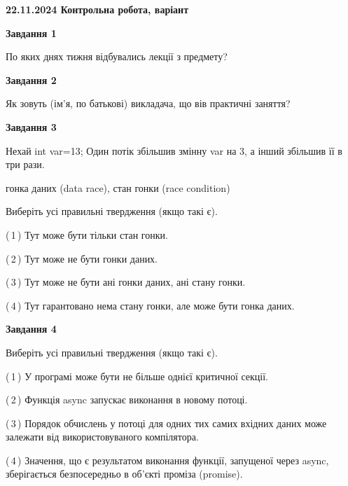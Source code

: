 \documentclass[12pt, ukrainian]{article}
\begin{document}
\begin {large}

\textbf{22.11.2024 Контрольна робота, варіант  }\par


{

\begin{center}
\textbf{Завдання 1}
\end{center}

По яких днях тижня відбувались лекції з предмету?


\begin{center}
\textbf{Завдання 2}
\end{center}

Як зовуть (ім'я, по батькові) викладача, що вів практичні заняття?


\begin{center}
\textbf{Завдання 3}
\end{center}

Нехай int var=13; Один потік збільшив змінну var на 3, а інший збільшив її в три рази.

гонка даних (data race), стан гонки (race condition)

Виберіть усі правильні твердження (якщо такі є).\par
\vspace{2mm}
(\,1\,) Тут може бути тільки стан гонки.%

(\,2\,) Тут може не бути гонки даних.%

(\,3\,) Тут може не бути ані гонки даних, ані стану гонки.%

(\,4\,) Тут гарантовано нема стану гонки, але може бути гонка даних.%


\begin{center}
\textbf{Завдання 4}
\end{center}

Виберіть усі правильні твердження (якщо такі є).\par
\vspace{2mm}

(\,1\,) У програмі може бути не більше однієї критичної секції.%

(\,2\,) Функція async запускає виконання в новому потоці.%

(\,3\,) Порядок обчислень у потоці для одних тих самих вхідних даних може залежати від використовуваного компілятора.%

(\,4\,) Значення, що є результатом виконання функції, запущеної через async, зберігається безпосередньо в об’єкті проміза (promise).%


}
\end{large}
\end{document}
